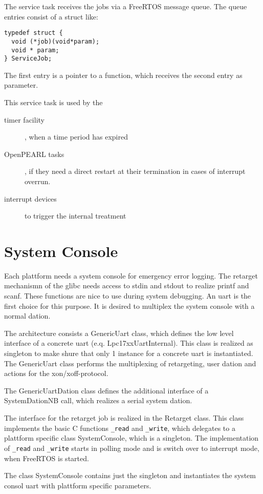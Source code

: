 The service task receives the jobs via a FreeRTOS message queue. 
The queue entries consist of a struct like:
\begin{verbatim}
typedef struct { 
  void (*job)(void*param);
  void * param;
} ServiceJob;
\end{verbatim}
The first entry is a pointer to a function, which receives the second entry
as parameter.

This service task is used by the
\begin{description}
\item[timer facility], when a time period has expired
\item[OpenPEARL tasks], if they need a direct restart at their
     termination in cases of interrupt overrun.
\item[interrupt devices] to trigger the internal treatment
\end{description}

\section{System Console}
Each plattform needs a system console for emergency error logging.
The retarget mechanismn of the glibc needs access to stdin and stdout
to realize printf and scanf. These functions are nice to use during 
system debugging.
An uart is the first choice for this purpose. It is desired to multiplex
the system console with a normal dation. 

The  architecture consists a GenericUart class, which defines the low 
level interface 
of a concrete uart (e.q. Lpc17xxUartInternal). This class is
realized as singleton to make shure that only 1 instance for a 
concrete uart is instantiated.
The GenericUart class performs the multiplexing of retargeting,
user dation and actions for the xon/xoff-protocol.

The GenericUartDation class defines the additional interface of a
SystemDationNB call, which realizes a serial system dation. 

The interface for the retarget job is realized in the Retarget class.
This class implements the basic C functions  \verb|_read| and \verb|_write|,
which delegates to a plattform specific class SystemConsole, which
is a singleton. 
The implementation of \verb|_read| and \verb|_write| starts in polling mode
and is switch over to interrupt mode, when FreeRTOS is started.

The class SystemConsole contains just the singleton and instantiates 
the system consol uart with plattform specific parameters.

